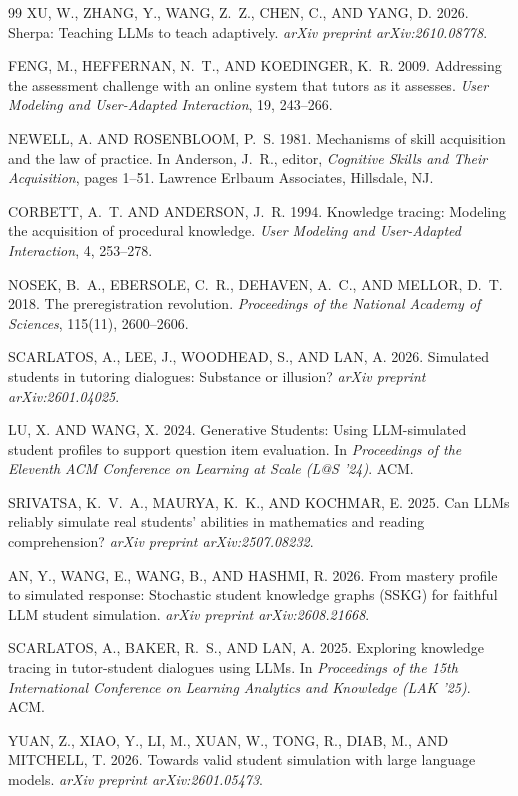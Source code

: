 \documentclass[12pt,a4paper]{article}
\begin{document}
\begin{thebibliography}{99}
XU, W., ZHANG, Y., WANG, Z.~Z., CHEN, C., AND YANG, D. 2026.
\newblock Sherpa: Teaching LLMs to teach adaptively.
\newblock \emph{arXiv preprint arXiv:2610.08778}.

FENG, M., HEFFERNAN, N.~T., AND KOEDINGER, K.~R. 2009.
\newblock Addressing the assessment challenge with an online system that tutors
  as it assesses.
\newblock \emph{User Modeling and User-Adapted Interaction}, 19, 243--266.

NEWELL, A. AND ROSENBLOOM, P.~S. 1981.
\newblock Mechanisms of skill acquisition and the law of practice.
\newblock In Anderson, J.~R., editor, \emph{Cognitive Skills and Their
  Acquisition}, pages 1--51. Lawrence Erlbaum Associates, Hillsdale, NJ.

CORBETT, A.~T. AND ANDERSON, J.~R. 1994.
\newblock Knowledge tracing: Modeling the acquisition of procedural knowledge.
\newblock \emph{User Modeling and User-Adapted Interaction}, 4, 253--278.

NOSEK, B.~A., EBERSOLE, C.~R., DEHAVEN, A.~C., AND MELLOR, D.~T. 2018.
\newblock The preregistration revolution.
\newblock \emph{Proceedings of the National Academy of Sciences}, 115(11),
  2600--2606.

SCARLATOS, A., LEE, J., WOODHEAD, S., AND LAN, A. 2026.
\newblock Simulated students in tutoring dialogues: Substance or illusion?
\newblock \emph{arXiv preprint arXiv:2601.04025}.

LU, X. AND WANG, X. 2024.
\newblock Generative Students: Using LLM-simulated student profiles to support
  question item evaluation.
\newblock In \emph{Proceedings of the Eleventh ACM Conference on Learning at
  Scale (L@S '24)}. ACM.

SRIVATSA, K.~V.~A., MAURYA, K.~K., AND KOCHMAR, E. 2025.
\newblock Can LLMs reliably simulate real students' abilities in mathematics
  and reading comprehension?
\newblock \emph{arXiv preprint arXiv:2507.08232}.

AN, Y., WANG, E., WANG, B., AND HASHMI, R. 2026.
\newblock From mastery profile to simulated response: Stochastic student
  knowledge graphs (SSKG) for faithful LLM student simulation.
\newblock \emph{arXiv preprint arXiv:2608.21668}.

SCARLATOS, A., BAKER, R.~S., AND LAN, A. 2025.
\newblock Exploring knowledge tracing in tutor-student dialogues using LLMs.
\newblock In \emph{Proceedings of the 15th International Conference on
  Learning Analytics and Knowledge (LAK '25)}. ACM.

YUAN, Z., XIAO, Y., LI, M., XUAN, W., TONG, R., DIAB, M., AND MITCHELL, T. 2026.
\newblock Towards valid student simulation with large language models.
\newblock \emph{arXiv preprint arXiv:2601.05473}.
\end{thebibliography}
\end{document}
